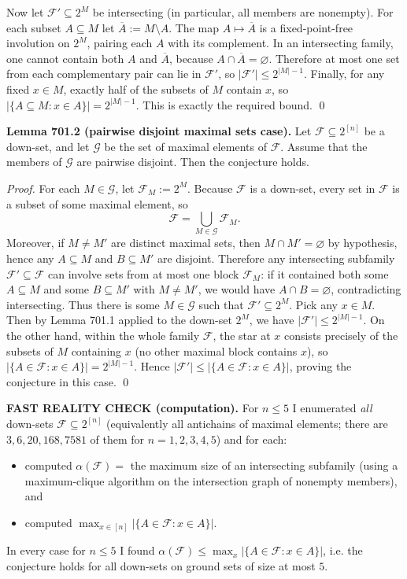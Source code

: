 Now let $\mathcal{F}'\subseteq 2^{M}$ be intersecting (in particular, all members are nonempty). For each subset $A\subseteq M$ let $\overline{A}:=M\setminus A$.
The map $A\mapsto \overline{A}$ is a fixed-point-free involution on $2^{M}$, pairing each $A$ with its complement.
In an intersecting family, one cannot contain both $A$ and $\overline{A}$, because $A\cap \overline{A}=\varnothing$.
Therefore at most one set from each complementary pair can lie in $\mathcal{F}'$, so
$|\mathcal{F}'|\le 2^{|M|-1}$.
Finally, for any fixed $x\in M$, exactly half of the subsets of $M$ contain $x$, so
$|\{A\subseteq M: x\in A\}|=2^{|M|-1}$.
This is exactly the required bound. \qed

\medskip
\textbf{Lemma 701.2 (pairwise disjoint maximal sets case).}
Let $\mathcal{F}\subseteq 2^{[n]}$ be a down-set, and let $\mathcal{G}$ be the set of maximal elements of $\mathcal{F}$.
Assume that the members of $\mathcal{G}$ are pairwise disjoint.
Then the conjecture holds.

\emph{Proof.}
For each $M\in\mathcal{G}$, let $\mathcal{F}_M:=2^{M}$.
Because $\mathcal{F}$ is a down-set, every set in $\mathcal{F}$ is a subset of some maximal element, so
\[\mathcal{F}=\bigcup_{M\in\mathcal{G}} \mathcal{F}_M.
\]
Moreover, if $M\ne M'$ are distinct maximal sets, then $M\cap M'=\varnothing$ by hypothesis, hence any $A\subseteq M$ and $B\subseteq M'$ are disjoint.
Therefore any intersecting subfamily $\mathcal{F}'\subseteq\mathcal{F}$ can involve sets from at most one block $\mathcal{F}_M$: if it contained both some $A\subseteq M$ and some $B\subseteq M'$ with $M\ne M'$, we would have $A\cap B=\varnothing$, contradicting intersecting.
Thus there is some $M\in\mathcal{G}$ such that $\mathcal{F}'\subseteq 2^{M}$.
Pick any $x\in M$. Then by Lemma 701.1 applied to the down-set $2^{M}$, we have $|\mathcal{F}'|\le 2^{|M|-1}$.
On the other hand, within the whole family $\mathcal{F}$, the star at $x$ consists precisely of the subsets of $M$ containing $x$ (no other maximal block contains $x$), so
$|\{A\in\mathcal{F}: x\in A\}|=2^{|M|-1}$.
Hence $|\mathcal{F}'|\le |\{A\in\mathcal{F}: x\in A\}|$, proving the conjecture in this case. \qed

\medskip
\textbf{FAST REALITY CHECK (computation).}
For $n\le 5$ I enumerated \emph{all} down-sets $\mathcal{F}\subseteq 2^{[n]}$ (equivalently all antichains of maximal elements; there are $3,6,20,168,7581$ of them for $n=1,2,3,4,5$) and for each:
\begin{itemize}
\item computed $\alpha(\mathcal{F})=$ the maximum size of an intersecting subfamily (using a maximum-clique algorithm on the intersection graph of nonempty members), and
\item computed $\max_{x\in[n]} |\{A\in\mathcal{F}: x\in A\}|$.
\end{itemize}
In every case for $n\le 5$ I found $\alpha(\mathcal{F})\le \max_x |\{A\in\mathcal{F}: x\in A\}|$, i.e. the conjecture holds for all down-sets on ground sets of size at most $5$.

